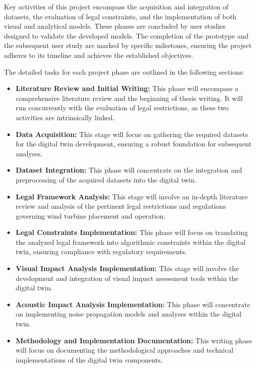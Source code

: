 \documentclass[11pt, titlepage, a4paper]{scrartcl}
\begin{document}
\begin{linenumbers}
    Key activities of this project encompass the acquisition and integration of datasets, the evaluation of legal constraints, and the implementation of both visual and analytical models. These phases are concluded by user studies designed to validate the developed models. The completion of the prototype and the subsequent user study are marked by specific milestones, ensuring the project adheres to its timeline and achieves the established objectives.

    The detailed tasks for each project phase are outlined in the following sections:

    \begin{itemize}
        \item \textbf{\color{purple}Literature Review and Initial Writing:} This phase will encompass a comprehensive literature review and the beginning of thesis writing. It will run concurrently with the evaluation of legal restrictions, as these two activities are intrinsically linked.
        \item \textbf{\color{green}Data Acquisition:} This stage will focus on gathering the required datasets for the digital twin development, ensuring a robust foundation for subsequent analyses.
        \item \textbf{\color{green}Dataset Integration:} This phase will concentrate on the integration and preprocessing of the acquired datasets into the digital twin.
        \item \textbf{\color{purple}Legal Framework Analysis:} This stage will involve an in-depth literature review and analysis of the pertinent legal restrictions and regulations governing wind turbine placement and operation.
        \item \textbf{\color{green}Legal Constraints Implementation:} This phase will focus on translating the analyzed legal framework into algorithmic constraints within the digital twin, ensuring compliance with regulatory requirements.
        \item \textbf{\color{green}Visual Impact Analysis Implementation:} This stage will involve the development and integration of visual impact assessment tools within the digital twin.
        \item \textbf{\color{green}Acoustic Impact Analysis Implementation:} This phase will concentrate on implementing noise propagation models and analyses within the digital twin.
        \item \textbf{\color{purple}Methodology and Implementation Documentation:} This writing phase will focus on documenting the methodological approaches and technical implementations of the digital twin components.

\end{itemize}
\end{linenumbers}
\end{document}
